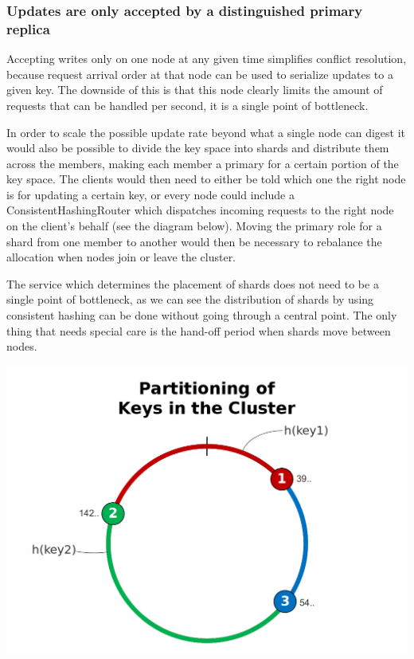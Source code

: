 \documentclass{article}
\begin{document}
\subsubsection{Updates are only accepted by a distinguished primary replica}

Accepting writes only on one node at any given time simplifies  conflict resolution, because request arrival order at that node can be  used to serialize updates to a given key. The downside of this is that  this node clearly limits the amount of requests that can be handled per second, it is a single point of bottleneck.

In order to scale the possible update rate beyond what a single node  can digest it would also be possible to divide the key space into shards  and distribute them across the members, making each member a primary  for a certain portion of the key space. The clients would then need to  either be told which one the right node is for updating a certain key,  or every node could include a ConsistentHashingRouter which dispatches  incoming requests to the right node on the client’s behalf (see the  diagram below). Moving the primary role for a shard from one member to  another would then be necessary to rebalance the allocation when nodes  join or leave the cluster.

The service which determines the placement of shards does not need to be a single point of bottleneck,  as we can see the distribution of shards by using consistent hashing  can be done without going through a central point. The only thing that  needs special care is the hand-off period when shards move between  nodes.
\begin{center}\includegraphics[scale=0.4]{partitioningofkeysinthecluster.png}
\end{center}	
\end{document}
